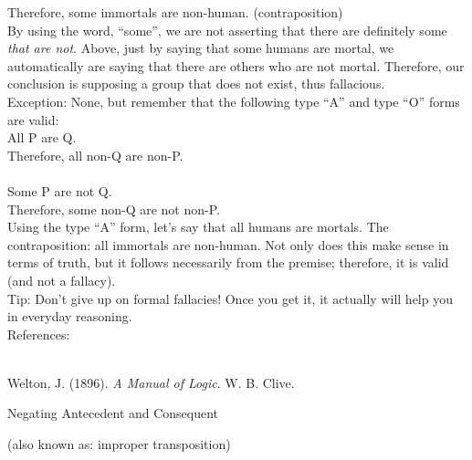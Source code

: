 \documentclass[a4paper,12pt,single,pdftex]{scrartcl}
\begin{document}
    
      Therefore, some immortals are non-human. (contraposition)
    \\

    
      By using the word, “some”, we are not asserting that there are definitely some {\it that are not}.  Above, just by saying that some humans are mortal, we automatically are saying that there are others who are not mortal.  Therefore, our conclusion is supposing a group that does not exist, thus fallacious.
    \\

    
      Exception: None, but remember that the following type “A” and type “O” forms are valid:
    \\

    
      All P are Q.
    \\

    
      Therefore, all non-Q are non-P.
    \\

    
       
    \\

    
      Some P are not Q.
    \\

    
      Therefore, some non-Q are not non-P.
    \\

    
      Using the type “A” form, let’s say that all humans are mortals.  The contraposition: all immortals are non-human.  Not only does this make sense in terms of truth, but it follows necessarily from the premise; therefore, it is valid (and not a fallacy).
    \\

    
      Tip: Don’t give up on formal fallacies!  Once you get it, it actually will help you in everyday reasoning.
    \\

    References:

    
      
        
      \\

      
        
          Welton, J. (1896). {\it A Manual of Logic}. W. B. Clive.
        
      
    
  

Negating Antecedent and Consequent
    
      (also known as: improper transposition)
    \\
\end{document}
